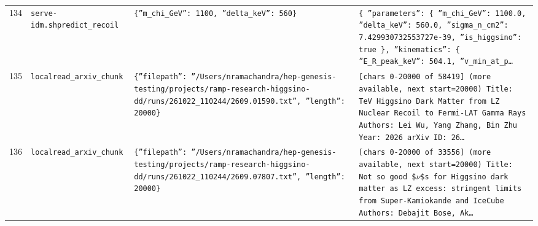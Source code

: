 \documentclass[11pt,a4paper]{article}
\begin{document}
\begin{longtable}{@{}p{}p{}p{}p{}@{}}
134 & \texttt{serve-idm.sh}\newline\texttt{predict\_\allowbreak{}recoil} & \texttt{\{''m\_\allowbreak{}chi\_\allowbreak{}GeV'':\allowbreak{} 1100,\allowbreak{} ''delta\_\allowbreak{}keV'':\allowbreak{} 560\}\allowbreak{}} & \texttt{\{   ''parameters'':\allowbreak{} \{     ''m\_\allowbreak{}chi\_\allowbreak{}GeV'':\allowbreak{} 1100.0,\allowbreak{}     ''delta\_\allowbreak{}keV'':\allowbreak{} 560.0,\allowbreak{}     ''sigma\_\allowbreak{}n\_\allowbreak{}cm2'':\allowbreak{} 7.429930732553727e-39,\allowbreak{}     ''is\_\allowbreak{}higgsino'':\allowbreak{} true   \}\allowbreak{},\allowbreak{}   ''kinematics'':\allowbreak{} \{     ''E\_\allowbreak{}R\_\allowbreak{}peak\_\allowbreak{}keV'':\allowbreak{} 504.1,\allowbreak{}     ''v\_\allowbreak{}min\_\allowbreak{}at\_\allowbreak{}p\ldots{}\allowbreak{}} \\
135 & \texttt{local}\newline\texttt{read\_\allowbreak{}arxiv\_\allowbreak{}chunk} & \texttt{\{''filepath'':\allowbreak{} ''/\allowbreak{}Users/\allowbreak{}nramachandra/\allowbreak{}hep-genesis-testing/\allowbreak{}projects/\allowbreak{}ramp-research-higgsino-dd/\allowbreak{}runs/\allowbreak{}261022\_\allowbreak{}110244/\allowbreak{}2609.01590.txt'',\allowbreak{} ''length'':\allowbreak{} 20000\}\allowbreak{}} & \texttt{[chars 0-20000 of 58419]\allowbreak{} (more available,\allowbreak{} next start=\allowbreak{}20000)\allowbreak{}  Title:\allowbreak{} TeV Higgsino Dark Matter from LZ Nuclear Recoil to Fermi-LAT Gamma Rays Authors:\allowbreak{} Lei Wu,\allowbreak{} Yang Zhang,\allowbreak{} Bin Zhu Year:\allowbreak{} 2026 arXiv ID:\allowbreak{} 26\ldots{}\allowbreak{}} \\
136 & \texttt{local}\newline\texttt{read\_\allowbreak{}arxiv\_\allowbreak{}chunk} & \texttt{\{''filepath'':\allowbreak{} ''/\allowbreak{}Users/\allowbreak{}nramachandra/\allowbreak{}hep-genesis-testing/\allowbreak{}projects/\allowbreak{}ramp-research-higgsino-dd/\allowbreak{}runs/\allowbreak{}261022\_\allowbreak{}110244/\allowbreak{}2609.07807.txt'',\allowbreak{} ''length'':\allowbreak{} 20000\}\allowbreak{}} & \texttt{[chars 0-20000 of 33556]\allowbreak{} (more available,\allowbreak{} next start=\allowbreak{}20000)\allowbreak{}  Title:\allowbreak{} Not so good \$$\nu$\$s for Higgsino dark matter as LZ excess:\allowbreak{} stringent limits from Super-Kamiokande and IceCube Authors:\allowbreak{} Debajit Bose,\allowbreak{} Ak\ldots{}\allowbreak{}} \\

\end{longtable}
\end{document}
